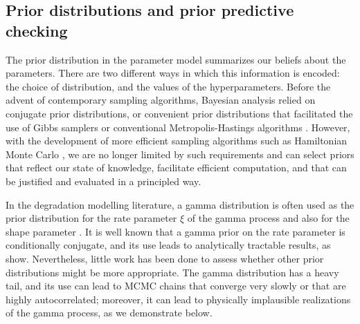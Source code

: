 \documentclass{article}
\begin{document}
\subsection{Prior distributions and prior predictive checking}
\label{subsec:prior}

The prior distribution in the parameter model summarizes our beliefs about the parameters. There are two different ways in which this information is encoded: the choice of distribution, and the values of the hyperparameters. Before the advent of contemporary sampling algorithms, Bayesian analysis relied on conjugate prior distributions, or convenient prior distributions that facilitated the use of Gibbs samplers or conventional Metropolis-Hastings algorithms \citep{gilks1996markov}. However, with the development of more efficient sampling algorithms such as Hamiltonian Monte Carlo \citep{betancourt_conceptual_2017}, we are no longer limited by such requirements and can select priors that reflect our state of knowledge, facilitate efficient computation, and that can be justified and evaluated in a principled way.  

In the degradation modelling literature, a gamma distribution is often used as the prior distribution for the rate parameter $\xi$ of the gamma process \citep{lawless_covariates_2004} and also for the shape parameter \citep{rodriguez-picon_degradation_2018}. It is well known that a gamma prior on the rate parameter is conditionally conjugate\citep{Pradhan_estimation_2011}, and its use leads to analytically tractable results, as \citet{lawless_covariates_2004} show. Nevertheless, little work has been done to assess whether other prior distributions might be more appropriate. The gamma distribution has a heavy tail, and its use can lead to MCMC chains that converge very slowly or that are highly autocorrelated; moreover, it can lead to physically implausible realizations of the gamma process, as we demonstrate below.
\end{document}
